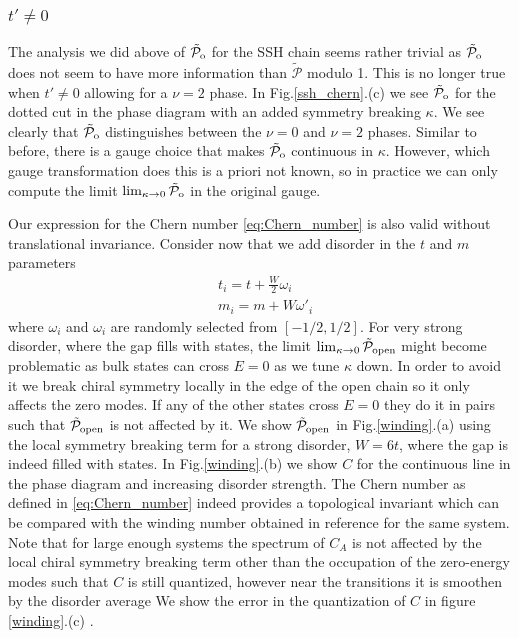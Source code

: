 \documentclass[twocolumn,amsmath,longbibliography,amssymb,superscriptaddress]{revtex4-1}
\newcommand{\tpo}{\tilde{\mathcal{P}}_{\rm o}}
\begin{document}
\subsubsection{$t' \neq 0$}

The analysis we did above of $\tpo$ for the SSH chain seems rather trivial as $\tpo$ does not seem to have more information than $\tilde{\mathcal{P}}$ modulo 1. This is no longer true when $t' \neq 0$ allowing for a $\nu = 2$ phase. In Fig.\ref{ssh_chern}.(c) we see $\tpo$ for the dotted cut in the phase diagram with an added symmetry breaking $\kappa$. We see clearly that $\tpo$ distinguishes between the $\nu=0$ and $\nu = 2$ phases. Similar to before, there is a gauge choice that makes $\tpo$ continuous in $\kappa$.
However, which gauge transformation does this is a priori not known, so in practice we can only compute the limit $\lim_{\kappa \rightarrow 0} \tpo$ in the original gauge.

Our expression for the Chern number \eqref{eq:Chern_number} is also valid without translational invariance. Consider now that we add disorder in the $t$ and $m$ parameters
\begin{align}
&t_i = t + \frac{W}{2} \omega_i \nonumber\\
&m_i = m + W \omega'_i
\end{align}
where $\omega_i$ and $\omega_i$ are randomly selected from $[-1/2,1/2]$. For very strong disorder, where the gap fills with states, the limit $\lim_{\kappa \rightarrow 0} \tilde{\mathcal{P}}_{\rm open}$ might become problematic as bulk states can cross $E=0$ as we tune $\kappa$ down. In order to avoid it we break chiral symmetry locally in the edge of the open chain so it only affects the zero modes. If any of the other states cross $E=0$ they do it in pairs such that $\tilde{\mathcal{P}}_{\rm open}$ is not affected by it. We show $\tilde{\mathcal{P}}_{\rm open}$ in Fig.\ref{winding}.(a) using the local symmetry breaking term for a strong disorder, $W=6t$, where the gap is indeed filled with states. In Fig.\ref{winding}.(b) we show $C$ for the continuous line in the phase diagram and increasing disorder strength. The Chern number as defined in \eqref{eq:Chern_number} indeed provides a topological invariant which can be compared with the winding number obtained in reference \cite{Song2014} for the same system. Note that for large enough systems the spectrum of $C_A$ is not affected by the local chiral symmetry breaking term other than the occupation of the zero-energy modes such that $C$ is still quantized, however near the transitions it is smoothen by the disorder average We show the error in the quantization of $C$ in figure \ref{winding}.(c) . 
\end{document}
